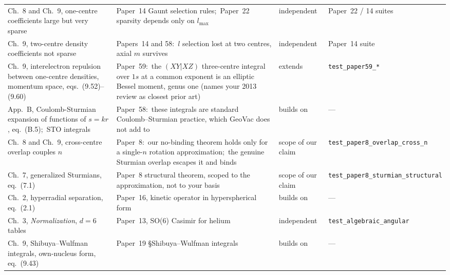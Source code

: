 \documentclass[11pt]{article}
\newcommand{\tst}[1]{\nolinkurl{#1}}
\newcommand{\bk}[1]{\textit{#1}}
\begin{document}
{\begin{longtable}{>{\raggedright\arraybackslash}p{}>{\raggedright\arraybackslash}p{}>{\raggedright\arraybackslash}p{}>{\raggedright\arraybackslash}p{}}
Ch.~8 and Ch.~9, one-centre coefficients large but very sparse & Paper~14 Gaunt selection rules;\ Paper~22 sparsity depends only on $l_{\max}$ & independent & Paper~22 / 14 suites\\
Ch.~9, two-centre density coefficients not sparse & Papers~14 and 58:\ $l$ selection lost at two centres, axial $m$ survives & independent & Paper~14 suite\\
Ch.~9, interelectron repulsion between one-centre densities, momentum space, eqs.~(9.52)--(9.60) & Paper~59:\ the $(XY|XZ)$ three-centre integral over $1s$ at a common exponent is an elliptic Bessel moment, genus one (names your 2013 review as closest prior art) & extends & \tst{test_paper59_*}\\
App.~B, Coulomb-Sturmian expansion of functions of $s=kr$, eq.~(B.5);\ STO integrals & Paper~58:\ these integrals are standard Coulomb--Sturmian practice, which GeoVac does not add to & builds on & ---\\
Ch.~8 and Ch.~9, cross-centre overlap couples $n$ & Paper~8:\ our no-binding theorem holds only for a single-$n$ rotation approximation;\ the genuine Sturmian overlap escapes it and binds & scope of our claim & \tst{test_paper8_overlap_cross_n}\\
Ch.~7, generalized Sturmians, eq.~(7.1) & Paper~8 structural theorem, scoped to the approximation, not to your basis & scope of our claim & \tst{test_paper8_sturmian_structural}\\
Ch.~2, hyperradial separation, eq.~(2.1) & Paper~16, kinetic operator in hyperspherical form & builds on & ---\\
Ch.~3, \bk{Normalization}, $d=6$ tables & Paper~13, SO(6) Casimir for helium & independent & \tst{test_algebraic_angular}\\
Ch.~9, Shibuya--Wulfman integrals, own-nucleus form, eq.~(9.43) & Paper~19 \S Shibuya--Wulfman integrals & builds on & ---\\
\bottomrule
\end{longtable}
}

\end{document}
